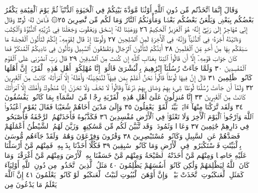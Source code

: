 وَقَالَ إِنَّمَا ٱتَّخَذْتُم مِّن دُونِ ٱللَّهِ أَوْثَٰنࣰا مَّوَدَّةَ بَيْنِكُمْ
فِي ٱلْحَيَوٰةِ ٱلدُّنْيَاۖ ثُمَّ يَوْمَ ٱلْقِيَٰمَةِ يَكْفُرُ بَعْضُكُم
بِبَعْضࣲ وَيَلْعَنُ بَعْضُكُم بَعْضࣰا وَمَأْوَىٰكُمُ ٱلنَّارُ
وَمَا لَكُم مِّن نَّٰصِرِينَ ٢٥۞ فَـَٔامَنَ لَهُۥ لُوطࣱۘ وَقَالَ
إِنِّي مُهَاجِرٌ إِلَىٰ رَبِّيٓۖ إِنَّهُۥ هُوَ ٱلْعَزِيزُ ٱلْحَكِيمُ ٢٦
وَوَهَبْنَا لَهُۥٓ إِسْحَٰقَ وَيَعْقُوبَ وَجَعَلْنَا فِي ذُرِّيَّتِهِ
ٱلنُّبُوَّةَ وَٱلْكِتَٰبَ وَءَاتَيْنَٰهُ أَجْرَهُۥ فِي ٱلدُّنْيَاۖ وَإِنَّهُۥ
فِي ٱلْأٓخِرَةِ لَمِنَ ٱلصَّٰلِحِينَ ٢٧ وَلُوطًا إِذْ قَالَ لِقَوْمِهِۦٓ
إِنَّكُمْ لَتَأْتُونَ ٱلْفَٰحِشَةَ مَا سَبَقَكُم بِهَا مِنْ أَحَدࣲ
مِّنَ ٱلْعَٰلَمِينَ ٢٨ أَئِنَّكُمْ لَتَأْتُونَ ٱلرِّجَالَ وَتَقْطَعُونَ
ٱلسَّبِيلَ وَتَأْتُونَ فِي نَادِيكُمُ ٱلْمُنكَرَۖ فَمَا كَانَ جَوَابَ
قَوْمِهِۦٓ إِلَّآ أَن قَالُوا۟ ٱئْتِنَا بِعَذَابِ ٱللَّهِ إِن كُنتَ مِنَ
ٱلصَّٰدِقِينَ ٢٩ قَالَ رَبِّ ٱنصُرْنِي عَلَى ٱلْقَوْمِ ٱلْمُفْسِدِينَ ٣٠
وَلَمَّا جَآءَتْ رُسُلُنَآ إِبْرَٰهِيمَ بِٱلْبُشْرَىٰ قَالُوٓا۟ إِنَّا مُهْلِكُوٓا۟
أَهْلِ هَٰذِهِ ٱلْقَرْيَةِۖ إِنَّ أَهْلَهَا كَانُوا۟ ظَٰلِمِينَ ٣١
قَالَ إِنَّ فِيهَا لُوطࣰاۚ قَالُوا۟ نَحْنُ أَعْلَمُ بِمَن فِيهَاۖ لَنُنَجِّيَنَّهُۥ
وَأَهْلَهُۥٓ إِلَّا ٱمْرَأَتَهُۥ كَانَتْ مِنَ ٱلْغَٰبِرِينَ ٣٢ وَلَمَّآ
أَن جَآءَتْ رُسُلُنَا لُوطࣰا سِيٓءَ بِهِمْ وَضَاقَ بِهِمْ ذَرْعࣰاۖ
وَقَالُوا۟ لَا تَخَفْ وَلَا تَحْزَنْ إِنَّا مُنَجُّوكَ وَأَهْلَكَ إِلَّا
ٱمْرَأَتَكَ كَانَتْ مِنَ ٱلْغَٰبِرِينَ ٣٣ إِنَّا مُنزِلُونَ عَلَىٰٓ أَهْلِ
هَٰذِهِ ٱلْقَرْيَةِ رِجْزࣰا مِّنَ ٱلسَّمَآءِ بِمَا كَانُوا۟ يَفْسُقُونَ ٣٤
وَلَقَد تَّرَكْنَا مِنْهَآ ءَايَةَۢ بَيِّنَةࣰ لِّقَوْمࣲ يَعْقِلُونَ ٣٥
وَإِلَىٰ مَدْيَنَ أَخَاهُمْ شُعَيْبࣰا فَقَالَ يَٰقَوْمِ ٱعْبُدُوا۟ ٱللَّهَ
وَٱرْجُوا۟ ٱلْيَوْمَ ٱلْأٓخِرَ وَلَا تَعْثَوْا۟ فِي ٱلْأَرْضِ مُفْسِدِينَ ٣٦
فَكَذَّبُوهُ فَأَخَذَتْهُمُ ٱلرَّجْفَةُ فَأَصْبَحُوا۟ فِي دَارِهِمْ
جَٰثِمِينَ ٣٧ وَعَادࣰا وَثَمُودَا۟ وَقَد تَّبَيَّنَ لَكُم
مِّن مَّسَٰكِنِهِمْۖ وَزَيَّنَ لَهُمُ ٱلشَّيْطَٰنُ أَعْمَٰلَهُمْ
فَصَدَّهُمْ عَنِ ٱلسَّبِيلِ وَكَانُوا۟ مُسْتَبْصِرِينَ ٣٨
وَقَٰرُونَ وَفِرْعَوْنَ وَهَٰمَٰنَۖ وَلَقَدْ جَآءَهُم مُّوسَىٰ بِٱلْبَيِّنَٰتِ
فَٱسْتَكْبَرُوا۟ فِي ٱلْأَرْضِ وَمَا كَانُوا۟ سَٰبِقِينَ ٣٩
فَكُلًّا أَخَذْنَا بِذَنۢبِهِۦۖ فَمِنْهُم مَّنْ أَرْسَلْنَا عَلَيْهِ حَاصِبࣰا
وَمِنْهُم مَّنْ أَخَذَتْهُ ٱلصَّيْحَةُ وَمِنْهُم مَّنْ خَسَفْنَا بِهِ
ٱلْأَرْضَ وَمِنْهُم مَّنْ أَغْرَقْنَاۚ وَمَا كَانَ ٱللَّهُ لِيَظْلِمَهُمْ
وَلَٰكِن كَانُوٓا۟ أَنفُسَهُمْ يَظْلِمُونَ ٤٠ مَثَلُ ٱلَّذِينَ
ٱتَّخَذُوا۟ مِن دُونِ ٱللَّهِ أَوْلِيَآءَ كَمَثَلِ ٱلْعَنكَبُوتِ
ٱتَّخَذَتْ بَيْتࣰاۖ وَإِنَّ أَوْهَنَ ٱلْبُيُوتِ لَبَيْتُ ٱلْعَنكَبُوتِۚ
لَوْ كَانُوا۟ يَعْلَمُونَ ٤١ إِنَّ ٱللَّهَ يَعْلَمُ مَا يَدْعُونَ مِن
